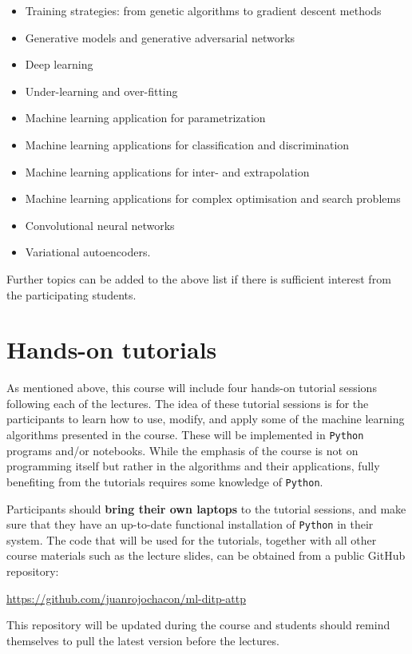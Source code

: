 \documentclass[12pt]{article}
\numberwithin{equation}{section}
\begin{document}
\begin{spacing}{1.1}
\begin{itemize}
\item Training strategies: from genetic algorithms to gradient descent methods

\item Generative models and generative adversarial networks

\item Deep learning  

\item Under-learning and over-fitting  

\item Machine learning application for parametrization 

\item Machine learning applications for classification and discrimination

\item Machine learning applications for inter- and extrapolation
  
\item Machine learning applications for complex optimisation and search problems

\item Convolutional neural networks

\item Variational autoencoders.
  
\end{itemize}
  
Further topics can be added to the above list if there is sufficient
interest from the participating students.

\section{Hands-on tutorials}

As mentioned above,
this course will include four hands-on tutorial sessions following each
of the lectures.
%
The idea of these tutorial
sessions is for the participants to learn how to use, modify, and apply
some of the machine learning algorithms presented in the course.
%
These will be implemented in {\tt Python} programs and/or notebooks.
%
While the emphasis of the course is not on programming itself but rather
in the algorithms and their applications, fully benefiting from the tutorials
requires some knowledge of {\tt Python}.


Participants should  {\bf bring their own laptops} to the tutorial sessions,
and make sure that they have an up-to-date functional installation of {\tt Python}
in their system.
%
The code that will be used for the tutorials, together with all other course
materials such as the lecture slides, can be obtained from a public GitHub
repository:
\begin{center}
  \url{https://github.com/juanrojochacon/ml-ditp-attp}
\end{center}
This repository will be updated during the course and students should remind
themselves to
pull the latest version before the lectures.


\end{spacing}
\end{document}
